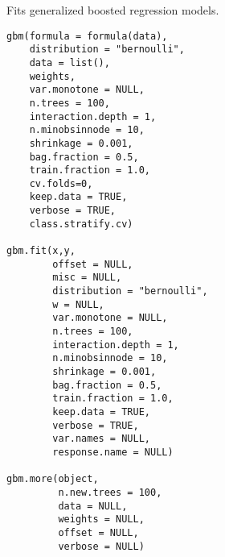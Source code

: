 \documentclass{article}
\begin{document}
\begin{Description}\relax
Fits generalized boosted regression models.
\end{Description}
\begin{Usage}
\begin{verbatim}
gbm(formula = formula(data),
    distribution = "bernoulli",
    data = list(),
    weights,
    var.monotone = NULL,
    n.trees = 100,
    interaction.depth = 1,
    n.minobsinnode = 10,
    shrinkage = 0.001,
    bag.fraction = 0.5,
    train.fraction = 1.0,
    cv.folds=0,
    keep.data = TRUE,
    verbose = TRUE,
    class.stratify.cv)

gbm.fit(x,y,
        offset = NULL,
        misc = NULL,
        distribution = "bernoulli",
        w = NULL,
        var.monotone = NULL,
        n.trees = 100,
        interaction.depth = 1,
        n.minobsinnode = 10,
        shrinkage = 0.001,
        bag.fraction = 0.5,
        train.fraction = 1.0,
        keep.data = TRUE,
        verbose = TRUE,
        var.names = NULL,
        response.name = NULL)

gbm.more(object,
         n.new.trees = 100,
         data = NULL,
         weights = NULL,
         offset = NULL,
         verbose = NULL)
\end{verbatim}
\end{Usage}
\end{document}
